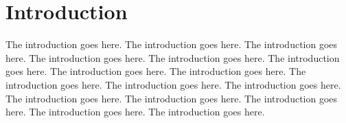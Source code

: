 \chapter{Introduction}

The introduction goes here.
The introduction goes here.
The introduction goes here.
The introduction goes here.
The introduction goes here.
The introduction goes here.
The introduction goes here.
The introduction goes here.
The introduction goes here.
The introduction goes here.
The introduction goes here.
The introduction goes here.
The introduction goes here.
The introduction goes here.
The introduction goes here.
The introduction goes here.
